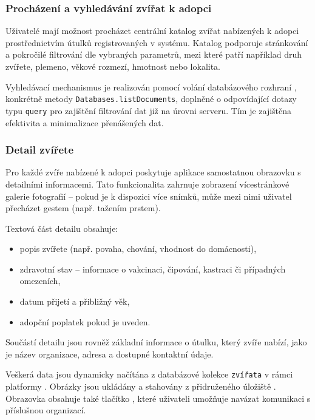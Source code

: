 \documentclass[czech, bp, kiv, he, iso690numb, pdf]{fasthesis}
\begin{document}
    \subsubsection*{Procházení a vyhledávání zvířat k adopci}

    Uživatelé mají možnost procházet centrální katalog zvířat nabízených k adopci prostřednictvím útulků registrovaných v systému. Katalog podporuje stránkování a pokročilé filtrování dle vybraných parametrů, mezi které patří například druh zvířete, plemeno, věkové rozmezí, hmotnost nebo lokalita.

    Vyhledávací mechanismus je realizován pomocí volání databázového rozhraní , konkrétně metody \texttt{Databases.listDocuments}, doplněné o odpovídající dotazy typu \texttt{query} pro zajištění filtrování dat již na úrovni serveru. Tím je zajištěna efektivita a minimalizace přenášených dat.

    \subsubsection*{Detail zvířete}

    Pro každé zvíře nabízené k adopci poskytuje aplikace samostatnou obrazovku s detailními informacemi. Tato funkcionalita zahrnuje zobrazení vícestránkové galerie fotografií – pokud je k dispozici více snímků, může mezi nimi uživatel přecházet gestem (např. tažením prstem).

    Textová část detailu obsahuje:
    \begin{itemize}
        \item popis zvířete (např. povaha, chování, vhodnost do domácnosti),
        \item zdravotní stav – informace o vakcinaci, čipování, kastraci či případných omezeních,
        \item datum přijetí a přibližný věk,
        \item adopční poplatek pokud je uveden.
    \end{itemize}

    Součástí detailu jsou rovněž základní informace o útulku, který zvíře nabízí, jako je název organizace, adresa a dostupné kontaktní údaje.

    Veškerá data jsou dynamicky načítána z databázové kolekce \texttt{zvířata} v rámci platformy . Obrázky jsou ukládány a stahovány z přidruženého úložiště . Obrazovka obsahuje také tlačítko , které uživateli umožňuje navázat komunikaci s příslušnou organizací.
\end{document}
